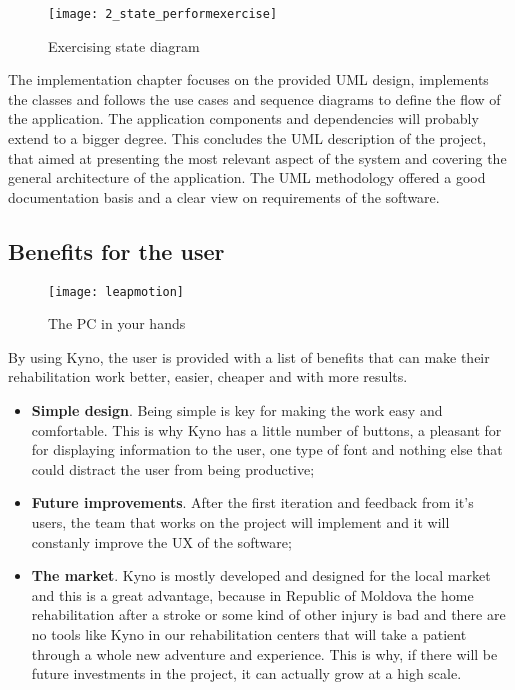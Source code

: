 \begin{figure}[!h]
\centering
\texttt{[image: 2\_state\_performexercise]}
\caption{Exercising state diagram}\label{state_perform}
\end{figure}

The implementation chapter focuses on the provided UML design, implements the classes and follows the use cases and sequence diagrams to define the flow of the application. The application components and dependencies will probably extend to a bigger degree. This concludes the UML description of the project, that aimed at presenting the most relevant aspect of the system and covering the general architecture of the application. The UML methodology offered a good documentation basis and a clear view on requirements of the software.

\subsection{Benefits for the user}

\begin{figure}[!h]
\centering
\texttt{[image: leapmotion]}
\caption{The PC in your hands \cite{leap}}\label{leapmotion]}
\end{figure}

By using Kyno, the user is provided with a list of benefits that can make their rehabilitation work better, easier, cheaper and with more results.

\begin{itemize}
\item \textbf{Simple design}. Being simple is key for making the work easy and comfortable. This is why Kyno has a little number of buttons, a pleasant for for displaying information to the user, one type of font and nothing else that could distract the user from being productive;

\item \textbf{Future improvements}. After the first iteration and feedback from it's users, the team that works on the project will implement and it will constanly improve the UX of the software;

\item \textbf{The market}. Kyno is mostly developed and designed for the local market and this is a great advantage, because in Republic of Moldova the home rehabilitation after a stroke or some kind of other injury is bad and there are no tools like Kyno in our rehabilitation centers that will take a patient through a whole new adventure and experience. This is why, if there will be future investments in the project, it can actually grow at a high scale.
\end{itemize}

\clearpage